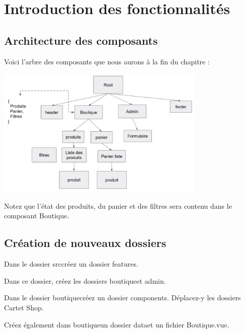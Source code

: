 \section{Introduction des fonctionnalités}
\subsection{Architecture des composants}
Voici l'arbre des composants que nous aurons à la fin du chapitre :
\begin{center}
\includegraphics[width=10cm]{images/image33.png}
\end{center}

Notez que l'état des produits, du panier et des filtres sera contenu dans le composant Boutique.

\subsection{Création de nouveaux dossiers}
Dans le dossier srccréez un dossier features.

Dans ce dossier, créez les dossiers boutiqueet admin.

Dans le dossier boutiquecréez un dossier components. Déplacez-y les dossiers Cartet Shop.

Créez également dans boutiqueun dossier dataet un fichier Boutique.vue.

